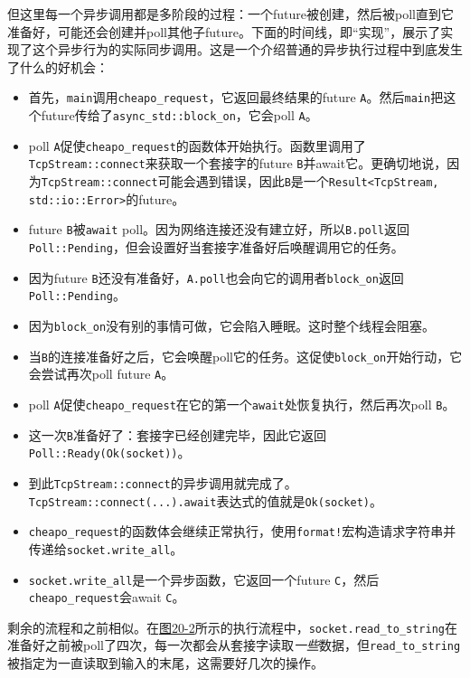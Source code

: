 但这里每一个异步调用都是多阶段的过程：一个future被创建，然后被poll直到它准备好，可能还会创建并poll其他子future。下面的时间线，即“实现”，展示了实现了这个异步行为的实际同步调用。这是一个介绍普通的异步执行过程中到底发生了什么的好机会：
\begin{itemize}
    \item 首先，\texttt{main}调用\texttt{cheapo\_request}，它返回最终结果的future \texttt{A}。然后\texttt{main}把这个future传给了\texttt{async\_std::block\_on}，它会poll \texttt{A}。
    \item poll \texttt{A}促使\texttt{cheapo\_request}的函数体开始执行。函数里调用了\texttt{TcpStream::connect}来获取一个套接字的future \texttt{B}并await它。更确切地说，因为\texttt{TcpStream::connect}可能会遇到错误，因此\texttt{B}是一个\texttt{Result<TcpStream, std::io::Error>}的future。
    \item future \texttt{B}被\texttt{await} poll。因为网络连接还没有建立好，所以\texttt{B.poll}返回\texttt{Poll::Pending}，但会设置好当套接字准备好后唤醒调用它的任务。
    \item 因为future \texttt{B}还没有准备好，\texttt{A.poll}也会向它的调用者\texttt{block\_on}返回\texttt{Poll::Pending}。
    \item 因为\texttt{block\_on}没有别的事情可做，它会陷入睡眠。这时整个线程会阻塞。
    \item 当\texttt{B}的连接准备好之后，它会唤醒poll它的任务。这促使\texttt{block\_on}开始行动，它会尝试再次poll future \texttt{A}。
    \item poll \texttt{A}促使\texttt{cheapo\_request}在它的第一个\texttt{await}处恢复执行，然后再次poll \texttt{B}。
    \item 这一次\texttt{B}准备好了：套接字已经创建完毕，因此它返回\texttt{Poll::Ready(Ok(socket))}。
    \item 到此\texttt{TcpStream::connect}的异步调用就完成了。\texttt{TcpStream::connect(...).await}表达式的值就是\texttt{Ok(socket)}。
    \item \texttt{cheapo\_request}的函数体会继续正常执行，使用\texttt{format!}宏构造请求字符串并传递给\texttt{socket.write\_all}。
    \item \texttt{socket.write\_all}是一个异步函数，它返回一个future \texttt{C}，然后\texttt{cheapo\_request}会await \texttt{C}。
\end{itemize}

剩余的流程和之前相似。在\hyperref[f20-2]{图20-2}所示的执行流程中，\texttt{socket.read\_to\_string}在准备好之前被poll了四次，每一次都会从套接字读取\emph{一些}数据，但\texttt{read\_to\_string}被指定为一直读取到输入的末尾，这需要好几次的操作。

